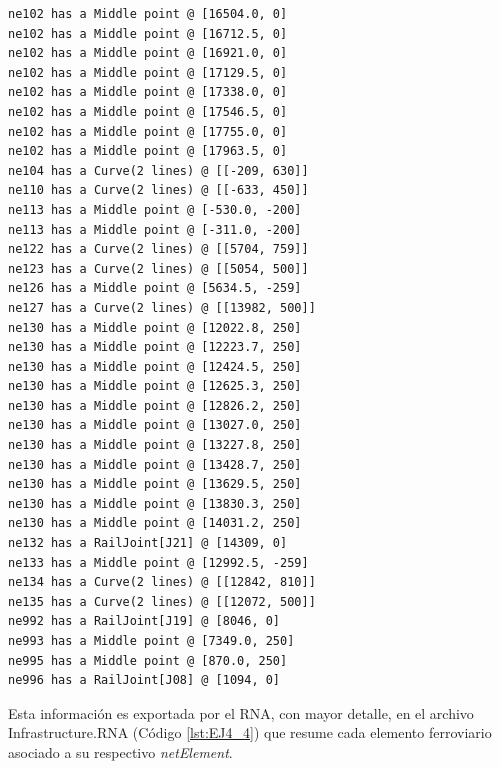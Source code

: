 \begin{lstlisting}[language = {}, tabsize=4, basicstyle=\footnotesize\ttfamily, showspaces=false, showstringspaces=false, caption = Detección de puntos críticos por parte del RNA , label = {lst:EJ4_2}]
ne102 has a Middle point @ [16504.0, 0]
ne102 has a Middle point @ [16712.5, 0]
ne102 has a Middle point @ [16921.0, 0]
ne102 has a Middle point @ [17129.5, 0]
ne102 has a Middle point @ [17338.0, 0]
ne102 has a Middle point @ [17546.5, 0]
ne102 has a Middle point @ [17755.0, 0]
ne102 has a Middle point @ [17963.5, 0]
ne104 has a Curve(2 lines) @ [[-209, 630]]
ne110 has a Curve(2 lines) @ [[-633, 450]]
ne113 has a Middle point @ [-530.0, -200]
ne113 has a Middle point @ [-311.0, -200]
ne122 has a Curve(2 lines) @ [[5704, 759]]
ne123 has a Curve(2 lines) @ [[5054, 500]]
ne126 has a Middle point @ [5634.5, -259]
ne127 has a Curve(2 lines) @ [[13982, 500]]
ne130 has a Middle point @ [12022.8, 250]
ne130 has a Middle point @ [12223.7, 250]
ne130 has a Middle point @ [12424.5, 250]
ne130 has a Middle point @ [12625.3, 250]
ne130 has a Middle point @ [12826.2, 250]
ne130 has a Middle point @ [13027.0, 250]
ne130 has a Middle point @ [13227.8, 250]
ne130 has a Middle point @ [13428.7, 250]
ne130 has a Middle point @ [13629.5, 250]
ne130 has a Middle point @ [13830.3, 250]
ne130 has a Middle point @ [14031.2, 250]
ne132 has a RailJoint[J21] @ [14309, 0]
ne133 has a Middle point @ [12992.5, -259]
ne134 has a Curve(2 lines) @ [[12842, 810]]
ne135 has a Curve(2 lines) @ [[12072, 500]]
ne992 has a RailJoint[J19] @ [8046, 0]
ne993 has a Middle point @ [7349.0, 250]
ne995 has a Middle point @ [870.0, 250]
ne996 has a RailJoint[J08] @ [1094, 0]
\end{lstlisting}

Esta información es exportada por el RNA, con mayor detalle, en el archivo Infrastructure.RNA (Código \ref{lst:EJ4_4}) que resume cada elemento ferroviario asociado a su respectivo \textit{netElement}.

